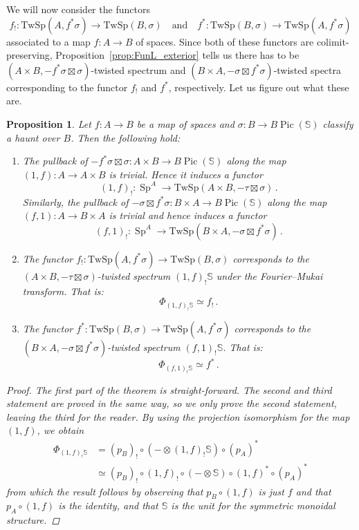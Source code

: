 \documentclass[10pt]{amsart}
\newcommand{\longto}{\longrightarrow}
\theoremstyle{plain}
\newtheorem{proposition}[theorem]{Proposition}
\theoremstyle{definition}
\DeclareMathOperator{\Sp}{Sp}
\DeclareMathOperator{\Pic}{Pic}
\newcommand{\bS}{\mathbb{S}}
\newcommand{\TwSp}{\mathrm{TwSp}}
\newcommand{\och}{\quad \text{and} \quad}
\begin{document}
We will now consider the functors
\[
f_! : \TwSp(A,f^* \sigma) \longto \TwSp(B,\sigma) \och f^* : \TwSp(B,\sigma) \longto \TwSp(A,f^* \sigma)
\]
associated to a map $f : A \to B$ of spaces.
Since both of these functors are colimit-preserving, Proposition~\ref{prop:FunL_exterior} tells us there has to be $(A \times B , -f^* \sigma \boxtimes \sigma)$-twisted spectrum and $(B \times A , -\sigma \boxtimes f^* \sigma)$-twisted spectra corresponding to the functor $f_!$ and $f^*$, respectively. Let us figure out what these are.

\begin{proposition} \label{prop:FM_adjoints}
  Let $f : A \to B$ be a map of spaces and $\sigma : B \to B\Pic(\bS)$ classify a haunt over $B$. Then the following hold:
  \begin{enumerate}
    \item The pullback of $-f^* \sigma \boxtimes \sigma : A \times B \to B\Pic(\bS)$ along the map $(1,f) : A \to A \times B$ is trivial. Hence it induces a functor
    \[
    (1,f)_! : \Sp^A \longto \TwSp(A \times B , -\tau \boxtimes \sigma) \,.
    \]
    Similarly, the pullback of $-\sigma \boxtimes f^* \sigma : B \times A \to B\Pic(\bS)$ along the map $(f,1) : A \to B \times A$ is trivial and hence induces a functor
    \[
    (f,1)_! : \Sp^{A} \longto \TwSp(B \times A , -\sigma \boxtimes f^* \sigma) \,.
    \]
    \item The functor $f_! : \TwSp(A,f^* \sigma) \to \TwSp(B,\sigma)$ corresponds to the $(A\times B,-\tau \boxtimes \sigma)$-twisted spectrum $(1,f)_! \bS$ under the Fourier--Mukai transform. That is:
    \[
    \Phi_{(1,f)_! \bS} \simeq f_! \,.
    \]
    \item The functor $f^* : \TwSp(B,\sigma) \to \TwSp(A,f^* \sigma)$ corresponds to the $(B \times A , -\sigma \boxtimes f^* \sigma)$-twisted spectrum $(f,1)_! \bS$. That is:
    \[
    \Phi_{(f,1)_! \bS } \simeq f^* \,.
    \]
  \end{enumerate}
  \begin{proof}
    The first part of the theorem is straight-forward. The second and third statement are proved in the same way, so we only prove the second statement, leaving the third for the reader. By using the projection isomorphism for the map $(1,f)$, we obtain
    \begin{align*}
    \Phi_{(1,f)_! \bS} &= (p_B)_! \circ (- \otimes (1,f)_! \bS)\circ (p_A)^* \\
    & \simeq (p_B)_! \circ (1,f)_! \circ ( - \otimes \bS) \circ (1,f)^* \circ (p_A)^*
    \end{align*}
    from which the result follows by observing that $p_B \circ (1,f)$ is just $f$ and that $p_A \circ (1,f)$ is the identity, and that $\bS$ is the unit for the symmetric monoidal structure.
  \end{proof}
\end{proposition}
\end{document}
